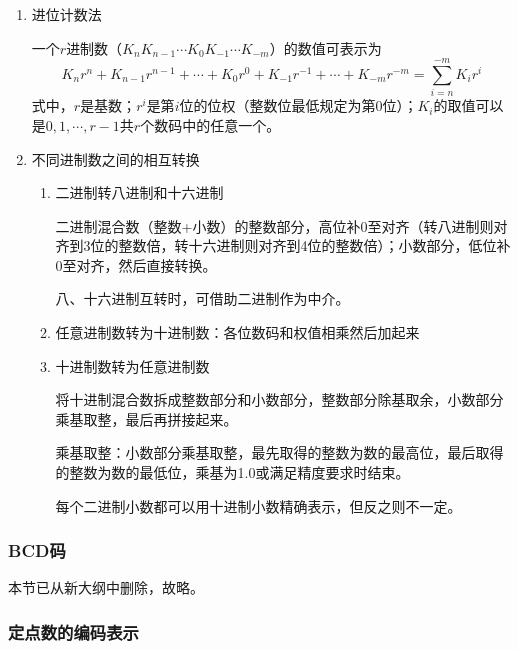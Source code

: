 \documentclass[12pt, a4paper, oneside]{ctexart}
\begin{document}
\begin{enumerate}
  \item {\kaishu 进位计数法}
  
  一个$r$进制数（$K_n K_{n-1}\cdots K_0 K_{-1}\cdots K_{-m}$）的数值可表示为
  \begin{equation*}
    K_n r^n+K_{n-1}r^{n-1}+\cdots+K_0 r^0+K_{-1}r^{-1}+\cdots+K_{-m}r^{-m}=\sum_{i=n}^{-m}K_i r^i
  \end{equation*}
  式中，$r$是基数；$r^i$是第$i$位的位权（整数位最低规定为第0位）；$K_i$的取值可以是$0,1,\cdots,r-1$共$r$个数码中的任意一个。
  \item {\kaishu 不同进制数之间的相互转换}
  \begin{enumerate}
    \item 二进制转八进制和十六进制
    
    二进制混合数（整数+小数）的整数部分，高位补0至对齐（转八进制则对齐到3位的整数倍，转十六进制则对齐到4位的整数倍）；小数部分，低位补0至对齐，然后直接转换。

    八、十六进制互转时，可借助二进制作为中介。
    \item 任意进制数转为十进制数：各位数码和权值相乘然后加起来
    \item 十进制数转为任意进制数
    
    将十进制混合数拆成整数部分和小数部分，整数部分除基取余，小数部分乘基取整，最后再拼接起来。

    乘基取整：小数部分乘基取整，最先取得的整数为数的最高位，最后取得的整数为数的最低位，乘基为1.0或满足精度要求时结束。

    每个二进制小数都可以用十进制小数精确表示，但反之则不一定。
  \end{enumerate}
\end{enumerate}

\subsubsection{BCD码}

本节已从新大纲中删除，故略。

\subsubsection{定点数的编码表示}
\end{document}
